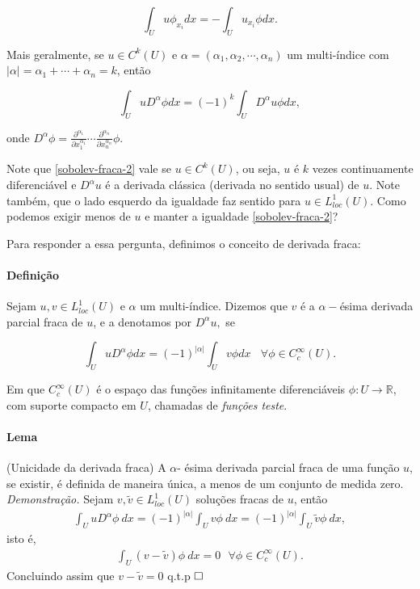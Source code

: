 \documentclass[11pt]{article}
\newcommand{\qed}{$\hfill\square$}
\newcommand{\R}{\mathbb{R}}
\begin{document}
\begin{equation}
	\int_{U} u \phi_{x_i} dx = - \int_{U} u_{x_i} \phi dx.
\end{equation}

Mais geralmente, se $u \in C^k(U)$ e $\alpha=(\alpha_1, \alpha_2, \cdots, \alpha_n)$ um multi-índice com $|\alpha|= \alpha_1 + \cdots +\alpha_n= k$, então

\begin{equation}\label{sobolev-fraca-2}
\int_{U} u D^{\alpha}\phi dx = (-1)^k \int_{U} D^{\alpha}u \phi dx,
\end{equation}

onde $D^{\alpha} \phi= \frac{\partial ^{\alpha_1}}{\partial x_1^{\alpha_1}}\cdots \frac{\partial ^{\alpha_n}}{\partial x_n^{\alpha_n}}\phi$.

Note que \eqref{sobolev-fraca-2} vale se $u \in C^k(U)$, ou seja, $u$ é $k$ vezes continuamente diferenciável e $D^{\alpha}u$ é a derivada clássica (derivada no sentido usual) de $u$. Note também, que o lado esquerdo  da igualdade faz sentido para $u \in L^1_{loc}(U)$. Como podemos exigir menos de $u$ e manter a igualdade \eqref{sobolev-fraca-2}?

Para responder a essa pergunta, definimos o conceito de derivada fraca:

\paragraph{Definição} Sejam $u,v \in L^1_{loc}(U)$ e $\alpha$ um multi-índice. Dizemos que $v$ é a $\alpha-$ésima derivada parcial fraca de $u$, e a denotamos por $D^{\alpha}u,$ se 

\begin{equation}\label{derivadafraca}
   \int_{U} u D^{\alpha}\phi dx = (-1)^{|\alpha|} \int_{U} v \phi dx  \ \ \ \ \forall \phi \in C^{\infty}_c(U).
   \end{equation}

Em que \( C^{\infty}_c (U) \) é o espaço das funções infinitamente diferenciáveis \( \phi:U\rightarrow \R \), com suporte compacto em \( U \), chamadas de \textit{funções teste}. 

\paragraph{Lema}(Unicidade da derivada fraca) A $\alpha$- ésima derivada parcial fraca de uma função $u$, se existir, é definida de maneira única, a menos de um conjunto de medida zero.
\textit{Demonstração.} Sejam $v, \tilde{v} \in L^1_{loc}(U)$ soluções fracas de $u$, então
 \begin{align*}
     \int_{U}u D^{\alpha}\phi \ dx = (-1)^{|\alpha|} \int _U v \phi \ dx= (-1)^{|\alpha|} \int _U \tilde{v} \phi \ dx,
 \end{align*}
isto é,
\begin{align*}
    \int_{U} (v - \tilde{v}) \phi \ dx = 0 \ \ \ \forall \phi \in C^{\infty}_c(U).
\end{align*}
Concluindo assim que $v-\tilde{v}=0$ q.t.p \qed
\end{document}

